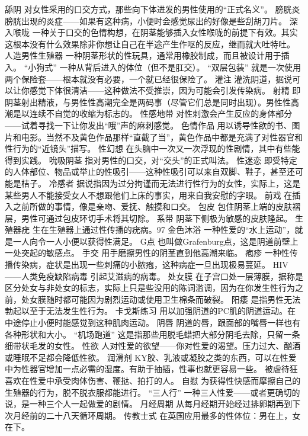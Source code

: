 \documentclass[12pt,UTF8,openany]{ctexbook}
\begin{document}
舔阴
对女性采用的口交方式，那些向下体进发的男性使用的“正式名义”。
膀胱炎
膀胱出现的炎症——如果有这种病，小便时会感觉尿出的好像是些刮胡刀片。
深入喉咙
一种关于口交的色情构想，在阴茎能够插入女性喉咙的前提下有效。其实这根本没有什么效果除非你想让自己在半途产生作呕的反应，继而就大吐特吐。
人造男性生殖器
一种阴茎形状的性玩具，通常用橡胶制成，而且被设计用于插入。
“小狗式”
一种从背后进入的体位（但不是肛交）。
“双层包装”
就是一次使用两个保险套——根本就没有必要，一个就已经很保险了。
灌注
灌洗阴道，据说可以让你感觉下体很清洁——这种做法不受推崇，因为可能会引发传染病。
射精
即阴茎射出精液，与男性性高潮完全是两码事（尽管它们总是同时出现）。男性性高潮是以连续不自觉的收缩为标志的。
性感地带
对性刺激会产生反应的身体部分——试着寻找一下让你发出“哦”声的麻刺感觉。
色情作品
用以诱导性欲的书、图片和电影。当然不及黄色作品那样“直截了当”，黄色作品中都是充满了对性器官和性行为的“近镜头”描写。
性幻想
在头脑中一次又一次浮现的性剧情，其中有些能得到实践。
吮吸阴茎
指对男性的口交，对“交头”的正式叫法。
性迷恋
即受特定的人体部位、物品或举止的性吸引——这种性吸引可以来自双脚、鞋子，甚至还可能是桔子。
冷感者
据说指因为过分拘谨而无法进行性行为的女性，实际上，这是某些男人不能接受女人不想跟他们上床的事实，用来自我安慰的字眼。
前戏
在插入之前所做的事情，像是亲吻、爱抚、触摸和口交。
包皮
包住阴茎上端的皮肤褶层，男性可通过包皮环切手术将其切除。
系带
阴茎下侧极为敏感的皮肤隆起。
生殖器疣
生在生殖器上通过性传播的疣病。97%
金色沐浴
一种性爱的“水上运动”，就是一人向令一人小便以获得性满足。
G点
也叫做Grafenburg点，这是阴道前壁上一处突起的敏感点。
手交
用手磨擦男性的阴茎直到他高潮来临。
疱疹
一种性传播传染病，症状是出现一些刺痛的小脓疱，这种病症一旦出现极易蔓延。
HIV——人类免疫缺陷病毒
引起艾滋病的病毒。
处女膜
在子宫口处一层薄膜，据称是区分处女与非处女的标志，实际上只是些没用的陈词滥调，因为在你发生性行为之前，处女膜随时都可能因为剧烈运动或使用卫生棉条而破裂。
阳痿
是指男性无法勃起以至于无法发生性行为。
卡戈斯练习
用以加强阴道的PC肌的阴道运动。在中途停止小便时能感觉到这种肌肉运动。
阴唇
阴道的唇，跟面部的嘴唇一样也有各种形状和大小。
“机场跑道”
这是指那些用脱毛蜡把大部分阴毛去除，只留一条细带状毛发的女性。
性欲
人对性爱的欲望——你对性爱的渴望。压力过大、酗酒或睡眠不足都会降低性欲。
润滑剂
KY胶、乳液或凝胶之类的东西，可以在性爱中为性器官增加一点必需的湿度。有助于抽插，性事也就更容易一些。
被虐待狂
喜欢在性爱中承受肉体伤害、鞭挞、拍打的人。
自慰
为获得性快感而摩擦自己的生殖器的行为，脱不脱衣服都能进行。
“三人行”
一种三人性爱——或者更确切的说，是一种三个人一起做爱的剧情。
月经周期
从每月经期开始经过排卵期再到下次月经前的二十八天循环周期。
传教士式
在英国应用最多的性体位：男在上，女在下。
\end{document}
